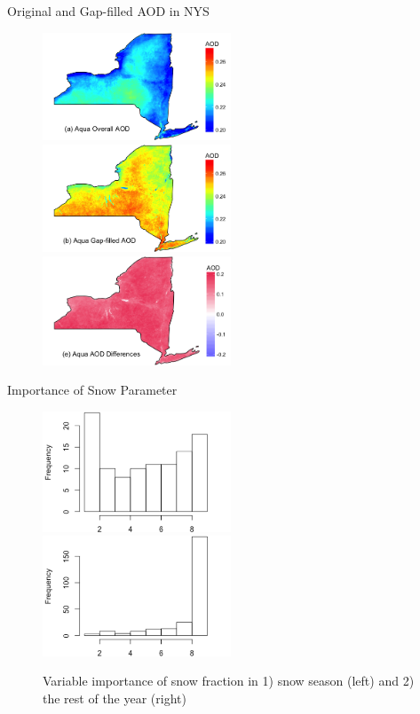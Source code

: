 \documentclass[handout]{beamer} %
\begin{document}
\begin{frame}{Original and Gap-filled AOD in NYS}
    \begin{figure}
        \centering
        \includegraphics[width=0.5\textwidth]{img/appendix/Aim1/figure21.png}
        \includegraphics[width=0.5\textwidth]{img/appendix/Aim1/figure22.png} \\
        \includegraphics[width=0.5\textwidth]{img/appendix/Aim1/figure25.png}
    \end{figure}
\end{frame}

\begin{frame}{Importance of Snow Parameter}
    \begin{figure}
        \centering
        \includegraphics[width=0.5\textwidth]{img/appendix/Aim1/snow_before.png}
        \includegraphics[width=0.5\textwidth]{img/appendix/Aim1/snow_after.png}
        \caption{Variable importance of snow fraction in 1) snow season (left) and 2) the rest of the year (right)}
    \end{figure}
\end{frame}
\end{document}
